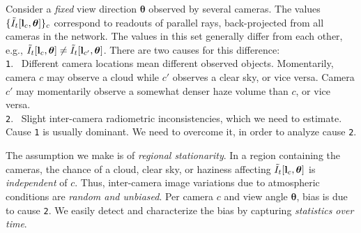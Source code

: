 \documentclass[runningheads]{llncs}
\begin{document}
Consider a {\em fixed} view direction ${\bm \theta}$ observed by several cameras.
The values $\{\tilde I_t[{\bf l}_c,{\bm \theta}]\}_c$ correspond to readouts of parallel rays, back-projected from all cameras in the network. The values in this set generally differ from each other, e.g.,
 $\tilde I_t[{\bf l}_c,{\bm \theta}]\neq \tilde I_t[{\bf l}_{c'},{\bm \theta}]$. There are two causes for this difference:\\
 {\tt 1}.~ Different camera locations mean different observed objects. Momentarily, camera $c$ may observe a cloud while $c'$ observes a clear sky, or vice versa. Camera $c'$ may momentarily observe a somewhat denser haze volume than $c$, or vice versa. \\
 {\tt 2}.~ Slight inter-camera radiometric inconsistencies, which we need to estimate.\\
 Cause {\tt 1} is usually dominant. We need to overcome it, in order to analyze cause {\tt 2}.

The assumption we make is of {\em regional stationarity}. In a region containing the cameras, the chance of a cloud, clear sky, or haziness affecting $\tilde I_t[{\bf l}_c,{\bm \theta}]$ is {\em independent} of $c$. Thus, inter-camera image variations due to atmospheric conditions are {\em random and unbiased}. Per camera $c$ and view angle ${\bm \theta}$, bias is due to cause {\tt 2}. We easily detect and characterize the bias by capturing {\em statistics over time}.
\end{document}
